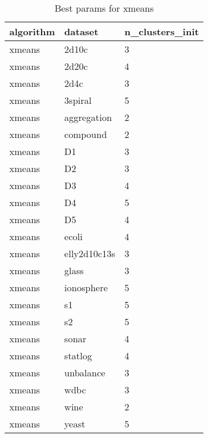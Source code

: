\clearpage

\begin{table}[H]
\centering
\caption{Best params for xmeans}
\label{S49_Table}
\begin{tabular}{|l|l|l|}
\hline
algorithm & dataset & n\_clusters\_init \\
\hline
xmeans & 2d10c & 3 \\
\hline
xmeans & 2d20c & 4 \\
\hline
xmeans & 2d4c & 3 \\
\hline
xmeans & 3spiral & 5 \\
\hline
xmeans & aggregation & 2 \\
\hline
xmeans & compound & 2 \\
\hline
xmeans & D1 & 3 \\
\hline
xmeans & D2 & 3 \\
\hline
xmeans & D3 & 4 \\
\hline
xmeans & D4 & 5 \\
\hline
xmeans & D5 & 4 \\
\hline
xmeans & ecoli & 4 \\
\hline
xmeans & elly2d10c13s & 3 \\
\hline
xmeans & glass & 3 \\
\hline
xmeans & ionosphere & 5 \\
\hline
xmeans & s1 & 5 \\
\hline
xmeans & s2 & 5 \\
\hline
xmeans & sonar & 4 \\
\hline
xmeans & statlog & 4 \\
\hline
xmeans & unbalance & 3 \\
\hline
xmeans & wdbc & 3 \\
\hline
xmeans & wine & 2 \\
\hline
xmeans & yeast & 5 \\
\hline
\end{tabular}
\end{table}

\clearpage

